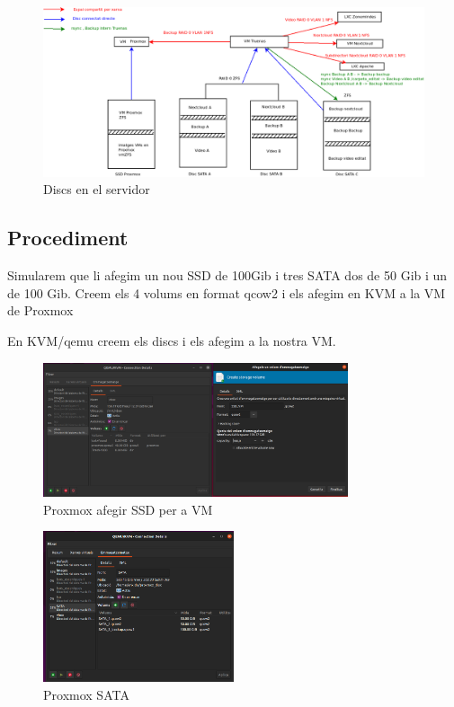 \documentclass[
  10pt,
]{krantz}
\begin{document}
\begin{figure}
\centering
\includegraphics{imatges/proxmox/Discs_servidor.png}
\caption{Discs en el servidor}
\end{figure}

\hypertarget{procediment}{%
\subsection{Procediment}\label{procediment}}

Simularem que li afegim un nou SSD de 100Gib i tres SATA dos de 50 Gib i un de 100 Gib. Creem els 4 volums en format qcow2 i els afegim en KVM a la VM de Proxmox

En KVM/qemu creem els discs i els afegim a la nostra VM.

\begin{figure}
\centering
\includegraphics[width=0.8\textwidth,height=\textheight]{imatges/proxmox/proxmox_SSD.png}
\caption{Proxmox afegir SSD per a VM}
\end{figure}

\begin{figure}
\centering
\includegraphics[width=0.5\textwidth,height=\textheight]{imatges/proxmox/proxmox_SATA.png}
\caption{Proxmox SATA}
\end{figure}
\end{document}
